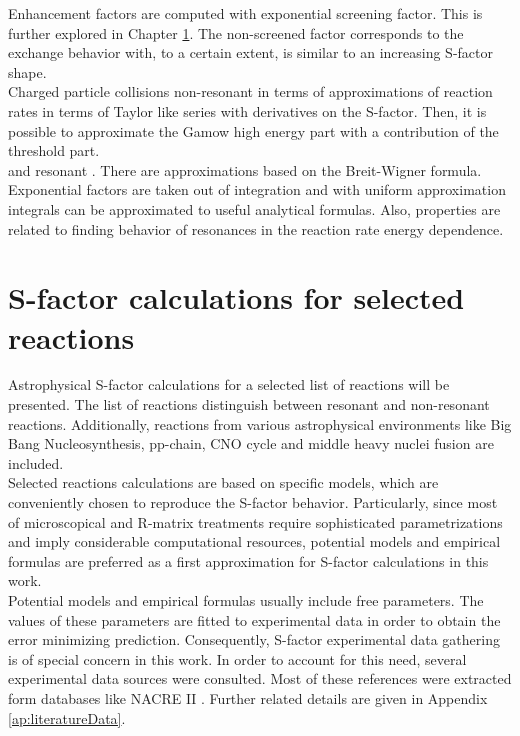 \documentclass[openany]{book}
\begin{document}
 Enhancement factors are computed with exponential screening factor. This is further explored in Chapter \ref{ch:sfactorCalculations}. The non-screened factor corresponds to the exchange behavior with, to a certain extent, is similar to an increasing S-factor shape. \\

Charged particle collisions non-resonant \cite{ueda_sargeant_pato_hussein_2002} in terms of approximations of reaction rates in terms of Taylor like series with derivatives on the S-factor.  Then, it is possible to approximate the Gamow high energy part with a contribution of the threshold part.  \\

 and resonant \cite{ueda_sargeant_pato_hussein_2004}. There are approximations based on the Breit-Wigner formula. Exponential factors are taken out of integration and with uniform approximation integrals can be approximated to useful analytical formulas. Also, properties are related to finding behavior of resonances in the reaction rate energy dependence.  \\


\chapter{S-factor calculations for selected reactions} \label{ch:sfactorCalculations}

Astrophysical S-factor calculations for a selected list of reactions will be presented. The list of reactions distinguish between resonant and non-resonant reactions. Additionally, reactions from various astrophysical environments like Big Bang Nucleosynthesis, pp-chain, CNO cycle and middle heavy nuclei fusion are included.  \\

Selected reactions calculations are based on specific models, which are conveniently chosen to reproduce the S-factor behavior. Particularly, since most of microscopical and R-matrix treatments require sophisticated parametrizations and imply considerable computational resources, potential models and empirical formulas are preferred as a first approximation for S-factor calculations in this work.  \\

Potential models and empirical formulas usually include free parameters. The values of these parameters are fitted to experimental data in order to obtain the error minimizing prediction. Consequently, S-factor experimental data gathering is of special concern in this work. In order to account for this need, several experimental data sources were consulted. Most of these references were extracted form databases like NACRE II \cite{xu_takahashi_goriely_arnould_ohta_utsunomiya_2013}. Further related details are given in Appendix \ref{ap:literatureData}. \\ 
\end{document}
